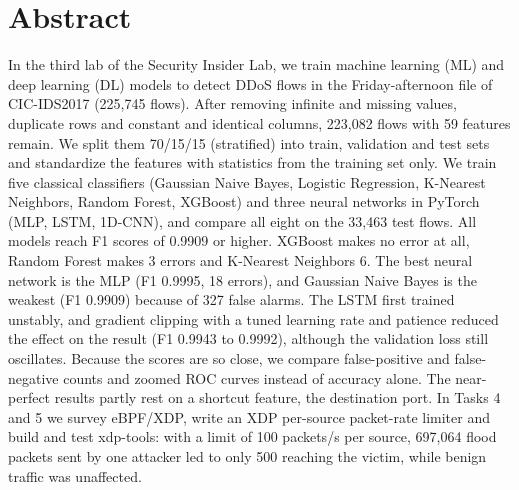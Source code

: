 \chapter*{Abstract}

In the third lab of the Security Insider Lab, we train machine learning (ML) and deep learning (DL) models to detect DDoS flows in the Friday-afternoon file of CIC-IDS2017 (225,745 flows). After removing infinite and missing values, duplicate rows and constant and identical columns, 223,082 flows with 59 features remain. We split them 70/15/15 (stratified) into train, validation and test sets and standardize the features with statistics from the training set only. We train five classical classifiers (Gaussian Naive Bayes, Logistic Regression, K-Nearest Neighbors, Random Forest, XGBoost) and three neural networks in PyTorch (MLP, LSTM, 1D-CNN), and compare all eight on the 33,463 test flows. All models reach F1 scores of 0.9909 or higher. XGBoost makes no error at all, Random Forest makes 3 errors and K-Nearest Neighbors 6. The best neural network is the MLP (F1 0.9995, 18 errors), and Gaussian Naive Bayes is the weakest (F1 0.9909) because of 327 false alarms. The LSTM first trained unstably, and gradient clipping with a tuned learning rate and patience reduced the effect on the result (F1 0.9943 to 0.9992), although the validation loss still oscillates. Because the scores are so close, we compare false-positive and false-negative counts and zoomed ROC curves instead of accuracy alone. The near-perfect results partly rest on a shortcut feature, the destination port. In Tasks 4 and 5 we survey eBPF/XDP, write an XDP per-source packet-rate limiter and build and test xdp-tools: with a limit of 100 packets/s per source, 697,064 flood packets sent by one attacker led to only 500 reaching the victim, while benign traffic was unaffected.
